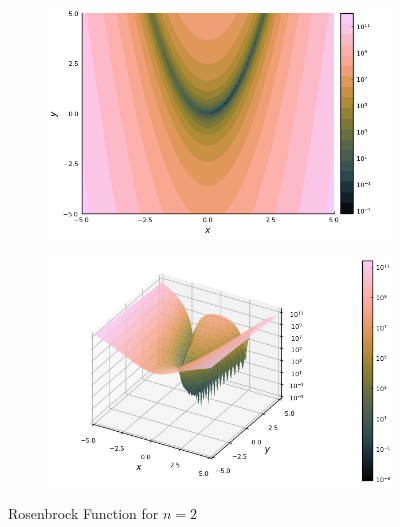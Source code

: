   \begin{figure}[ht!]
    \centering
    \begin{subfigure}[b]{0.4\textwidth}
      \centering
      \includegraphics[width=\textwidth]{img/test_functions/rosenbrock_contour.png}
    \end{subfigure}
    \begin{subfigure}[b]{0.4\textwidth}
      \centering
      \includegraphics[width=\textwidth]{img/test_functions/rosenbrock_surface.png}
    \end{subfigure}
    \caption{Rosenbrock Function for \(n = 2\)}
    \label{fig:rosenbrock_function}
  \end{figure}